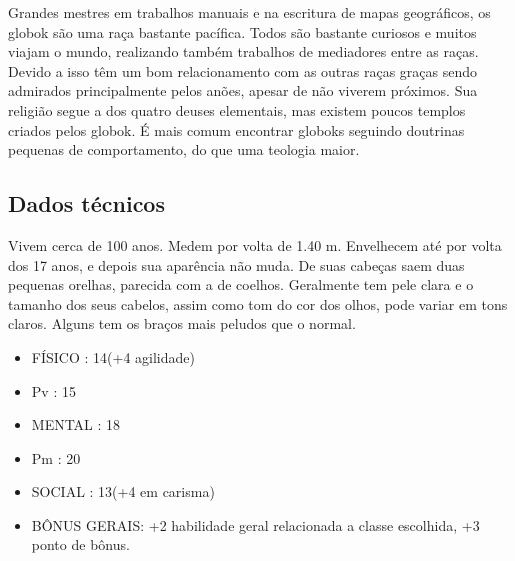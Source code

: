 Grandes mestres em trabalhos manuais e na escritura de mapas geográficos, os globok são uma raça bastante pacífica. Todos são bastante curiosos e muitos viajam o mundo, realizando também trabalhos de mediadores entre as raças. Devido a isso têm um bom relacionamento com as outras raças graças sendo admirados principalmente pelos anões, apesar de não viverem próximos. Sua religião segue a dos quatro deuses elementais, mas existem poucos templos criados pelos globok. É mais comum encontrar globoks seguindo doutrinas pequenas de comportamento, do que uma teologia maior. 


\subsection{Dados técnicos}


Vivem cerca de 100 anos. Medem por volta de 1.40 m. Envelhecem até por volta dos 17 anos, e depois sua aparência não muda. De suas cabeças saem duas pequenas orelhas, parecida com a de coelhos. Geralmente tem pele clara e o tamanho dos seus cabelos, assim como tom do cor dos olhos, pode variar em tons claros. Alguns tem os braços mais peludos que o normal.


\begin{itemize}


\item FÍSICO : 14(+4 agilidade)
\item Pv : 15 

\item MENTAL : 18
\item Pm : 20

\item SOCIAL : 13(+4 em carisma)

\item BÔNUS GERAIS: +2 habilidade geral relacionada a classe escolhida, +3 ponto de bônus.


\end{itemize}
